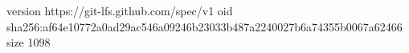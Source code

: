 version https://git-lfs.github.com/spec/v1
oid sha256:af64e10772a0ad29ac546a09246b23033b487a2240027b6a74355b0067a62466
size 1098
